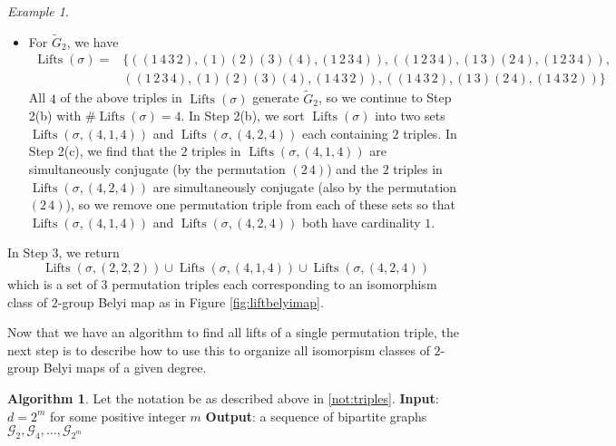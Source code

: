 \documentclass{dcthesis}
\newcommand{\wt}[1]{\widetilde{#1}}
\DeclareMathOperator{\Lifts}{Lifts}
\theoremstyle{definition}
\newtheorem{alg}[prop]{Algorithm}
\theoremstyle{remark}
\newtheorem{example}[prop]{Example}
\numberwithin{equation}{section}
\numberwithin{figure}{section}
\begin{document}
{{\begin{example}
\begin{itemize}
          $\Lifts(\sigma, (2,2,2))$ are simultaneously conjugate
          (by the permutation $(2\,4)$)
          and hence we remove one of the triples from $\Lifts(\sigma, (2,2,2))$.
        \item
          For $\wt{G}_2$, we have
          \begin{align*}
            \Lifts(\sigma) =
            &\Big\{
              ((1\,4\,3\,2), (1)(2)(3)(4), (1\,2\,3\,4)),
              ((1\,2\,3\,4), (1\,3)(2\,4), (1\,2\,3\,4)),\\
            &((1\,2\,3\,4),  (1)(2)(3)(4), (1\,4\,3\,2)),
              ((1\,4\,3\,2), (1\,3)(2\,4), (1\,4\,3\,2))
            \Big\}
          \end{align*}
          All $4$ of the above triples in $\Lifts(\sigma)$
          generate $\wt{G}_2$, so we continue to Step 2(b) with
          $\#\Lifts(\sigma) = 4$.
          In Step 2(b),
          we sort $\Lifts(\sigma)$ into two sets
          $\Lifts(\sigma, (4,1,4))$ and $\Lifts(\sigma,(4,2,4))$
          each containing $2$ triples.
          In Step 2(c),
          we find that the $2$ triples in $\Lifts(\sigma, (4,1,4))$
          are simultaneously conjugate
          (by the permutation $(2\,4)$)
          and the $2$ triples in $\Lifts(\sigma, (4,2,4))$
          are simultaneously conjugate
          (also by the permutation $(2\,4)$),
          so we remove one permutation triple from each of these sets
          so that $\Lifts(\sigma, (4,1,4))$
          and
          $\Lifts(\sigma, (4,2,4))$ both have cardinality $1$.
      \end{itemize}
      In Step 3,
      we return
      \[
        \Lifts(\sigma, (2,2,2))\cup\Lifts(\sigma, (4,1,4))\cup\Lifts(\sigma, (4,2,4))
      \]
      which is a set of $3$ permutation triples
      each corresponding to an isomorphism class of $2$-group Belyi map
      as in Figure \ref{fig:liftbelyimap}.
    \end{example}
    Now that we have an algorithm to find all lifts of a single
    permutation triple,
    the next step is to describe how to use this
    to organize all isomorpism classes of $2$-group Belyi maps
    of a given degree.
    \begin{alg}\label{alg:alltriples}
      Let the notation be as described above in \ref{not:triples}.
      \newline
      \textbf{Input}: $d = 2^m$ for some positive integer $m$
      \newline
      \textbf{Output}: a sequence of bipartite graphs
      $\mathscr{G}_2, \mathscr{G}_4,\dots,\mathscr{G}_{2^m}$

\end{alg}}}
\end{document}
